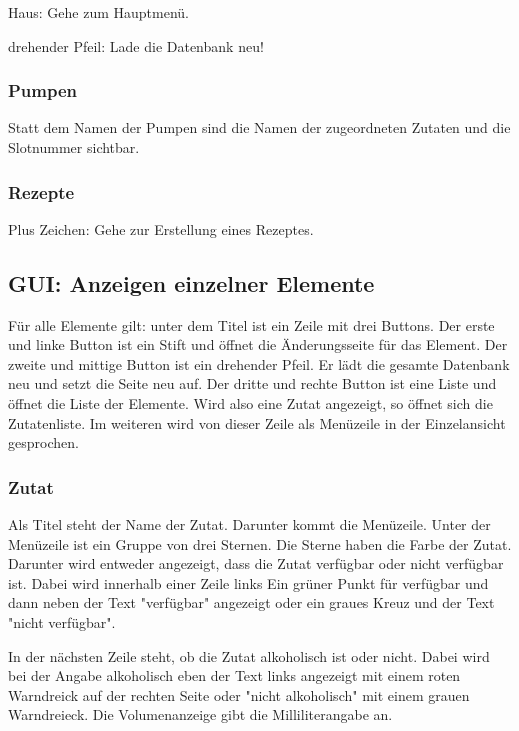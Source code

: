 Haus: Gehe zum Hauptmenü.

drehender Pfeil: Lade die Datenbank neu!

\subsubsection{Pumpen}

Statt dem Namen der Pumpen sind die Namen der zugeordneten Zutaten und die Slotnummer sichtbar.

\subsubsection{Rezepte}

Plus Zeichen: Gehe zur Erstellung eines Rezeptes.

\subsection{GUI: Anzeigen einzelner Elemente}

Für alle Elemente gilt: unter dem Titel ist ein Zeile mit drei Buttons. Der erste und linke Button ist ein Stift und öffnet die Änderungsseite für das Element. Der zweite und mittige Button ist ein drehender Pfeil. Er lädt die gesamte Datenbank neu und setzt die Seite neu auf. Der dritte und rechte Button ist eine Liste und öffnet die Liste der Elemente. Wird also eine Zutat angezeigt, so öffnet sich die Zutatenliste. Im weiteren wird von dieser Zeile als Menüzeile in der Einzelansicht gesprochen.

\subsubsection{Zutat}

Als Titel steht der Name der Zutat. Darunter kommt die Menüzeile. Unter der Menüzeile ist ein Gruppe von drei Sternen. Die Sterne haben die Farbe der Zutat. Darunter wird entweder angezeigt, dass die Zutat verfügbar oder nicht verfügbar ist. Dabei wird innerhalb einer Zeile links Ein grüner Punkt für verfügbar und dann neben der Text "verfügbar" angezeigt oder ein graues Kreuz und der Text "nicht verfügbar".

In der nächsten Zeile steht, ob die Zutat alkoholisch ist oder nicht. Dabei wird bei der Angabe alkoholisch eben der Text links angezeigt mit einem roten Warndreick auf der rechten Seite oder "nicht alkoholisch" mit einem grauen Warndreieck. Die Volumenanzeige gibt die Milliliterangabe an.

